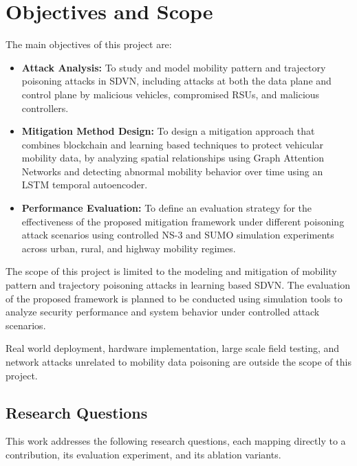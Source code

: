 \documentclass[12pt, a4paper]{report}
\begin{document}
\section{Objectives and Scope}

The main objectives of this project are:
\begin{itemize}
	\item \textbf{Attack Analysis:}
	To study and model mobility pattern and trajectory poisoning attacks in SDVN, including attacks at both the data plane and control plane by malicious vehicles, compromised RSUs, and malicious controllers.


	\item \textbf{Mitigation Method Design:}
To design a mitigation approach that combines blockchain and
learning based techniques to protect vehicular mobility data, by
analyzing spatial relationships using Graph Attention Networks and
detecting abnormal mobility behavior over time using an LSTM temporal
autoencoder.

\item \textbf{Performance Evaluation:}
To define an evaluation strategy for the effectiveness of the
proposed mitigation framework under different poisoning attack
scenarios using controlled NS-3 and SUMO simulation experiments
across urban, rural, and highway mobility regimes.
\end{itemize}

The scope of this project is limited to the modeling and mitigation of mobility pattern and trajectory poisoning attacks in learning based SDVN. The evaluation of the proposed framework is planned to be conducted using simulation tools to analyze security performance and system behavior under controlled attack scenarios.

Real world deployment, hardware implementation, large scale field testing, and network attacks unrelated to mobility data poisoning are outside the scope of this project.


\subsection{Research Questions}
\label{sec:rqs}

This work addresses the following research questions, each mapping
directly to a contribution, its evaluation experiment, and its
ablation variants.
\end{document}

